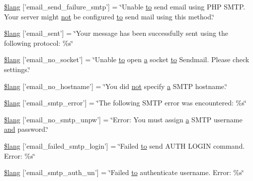 \begin{DoxyCompactItemize}
\item 
\hyperlink{email__lang_8php_a37e19fc7057ba5d5300dd3e83cefc5a2}{\$lang} \mbox{[}'email\-\_\-send\-\_\-failure\-\_\-smtp'\mbox{]} = \char`\"{}Unable \hyperlink{mathquill_8js_ae3622f38202b3532cd6eae25726945f8}{to} send email using P\-H\-P S\-M\-T\-P. Your server might \hyperlink{mathquill_8js_ac1e1ab538c27d68cc2cbafea74e7412c}{not} be configured \hyperlink{mathquill_8js_ae3622f38202b3532cd6eae25726945f8}{to} send mail using this method.\char`\"{}
\item 
\hyperlink{email__lang_8php_a7e5c67019fdffb596af1af5a94247ba9}{\$lang} \mbox{[}'email\-\_\-sent'\mbox{]} = \char`\"{}Your message has been successfully sent using the following protocol\-: \%s\char`\"{}
\item 
\hyperlink{email__lang_8php_a78f8be783ca93e91af775994ddc87cb7}{\$lang} \mbox{[}'email\-\_\-no\-\_\-socket'\mbox{]} = \char`\"{}Unable \hyperlink{mathquill_8js_ae3622f38202b3532cd6eae25726945f8}{to} open \hyperlink{bootstrap_8min_8js_a7318f59fb86a4437995ee89c780c51ac}{a} socket \hyperlink{mathquill_8js_ae3622f38202b3532cd6eae25726945f8}{to} Sendmail. Please check settings.\char`\"{}
\item 
\hyperlink{email__lang_8php_a03905b414e05a5d3cfd0fe88868615f5}{\$lang} \mbox{[}'email\-\_\-no\-\_\-hostname'\mbox{]} = \char`\"{}You did \hyperlink{mathquill_8js_ac1e1ab538c27d68cc2cbafea74e7412c}{not} specify \hyperlink{bootstrap_8min_8js_a7318f59fb86a4437995ee89c780c51ac}{a} S\-M\-T\-P hostname.\char`\"{}
\item 
\hyperlink{email__lang_8php_a3d70a704117491053ad9c0b4065ecd3f}{\$lang} \mbox{[}'email\-\_\-smtp\-\_\-error'\mbox{]} = \char`\"{}The following S\-M\-T\-P error was encountered\-: \%s\char`\"{}
\item 
\hyperlink{email__lang_8php_a268c3e96fea16a903e7488f03960e89a}{\$lang} \mbox{[}'email\-\_\-no\-\_\-smtp\-\_\-unpw'\mbox{]} = \char`\"{}Error\-: You must assign \hyperlink{bootstrap_8min_8js_a7318f59fb86a4437995ee89c780c51ac}{a} S\-M\-T\-P username \hyperlink{mathquill_8js_ac39c488ee3bd6d675c340966d33495a7}{and} password.\char`\"{}
\item 
\hyperlink{email__lang_8php_a791781c2fd1bd8ec87158be649519621}{\$lang} \mbox{[}'email\-\_\-failed\-\_\-smtp\-\_\-login'\mbox{]} = \char`\"{}Failed \hyperlink{mathquill_8js_ae3622f38202b3532cd6eae25726945f8}{to} send A\-U\-T\-H L\-O\-G\-I\-N command. Error\-: \%s\char`\"{}
\item 
\hyperlink{email__lang_8php_a69f2fa5072f039936748571ea5cc9cba}{\$lang} \mbox{[}'email\-\_\-smtp\-\_\-auth\-\_\-un'\mbox{]} = \char`\"{}Failed \hyperlink{mathquill_8js_ae3622f38202b3532cd6eae25726945f8}{to} authenticate username. Error\-: \%s\char`\"{}

\end{DoxyCompactItemize}
